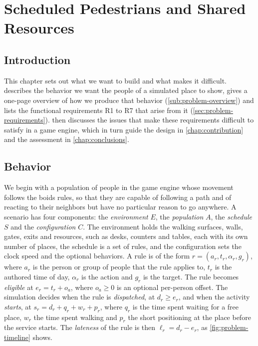 \chapter{Scheduled Pedestrians and Shared Resources}\label{chap:problem}

\section{Introduction}\label{sec:problem-intro}

This chapter sets out what we want to build and what makes it difficult.  describes the behavior we want the people of a simulated place to show, gives a one-page overview of how we produce that behavior (\cref{sub:problem-overview}) and lists the functional requirements R1 to R7 that arise from it (\cref{sec:problem-requirements}).  then discusses the issues that make these requirements difficult to satisfy in a game engine, which in turn guide the design in \cref{chap:contribution} and the assessment in \cref{chap:conclusions}.

\section{Behavior}\label{sec:problem-statement}

We begin with a population of people in the game engine whose movement follows the boids rules, so that they are capable of following a path and of reacting to their neighbors but have no particular reason to go anywhere. A scenario has four components: the \emph{environment} $E$, the \emph{population} $A$, the \emph{schedule} $S$ and the \emph{configuration} $C$. The environment holds the walking surfaces, walls, gates, exits and resources, such as desks, counters and tables, each with its own number of places, the schedule is a set of rules, and the configuration sets the clock speed and the optional behaviors. A rule is of the form $r = (a_r, t_r, \alpha_r, g_r)$, where $a_r$ is the person or group of people that the rule applies to, $t_r$ is the authored time of day, $\alpha_r$ is the action and $g_r$ is the target. The rule becomes \emph{eligible} at $e_r = t_r + o_{a}$, where $o_{a} \geq 0$ is an optional per-person offset. The simulation decides when the rule is \emph{dispatched}, at $d_r \geq e_r$, and when the activity \emph{starts}, at $s_r = d_r + q_r + w_r + p_r$, where $q_r$ is the time spent waiting for a free place, $w_r$ the time spent walking and $p_r$ the short positioning at the place before the service starts. The \emph{lateness} of the rule is then $\ell_r = d_r - e_r$, as \cref{fig:problem-timeline} shows.

